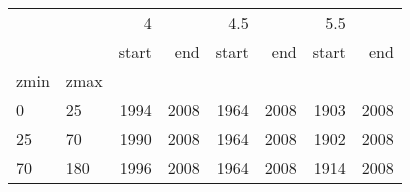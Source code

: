 \begin{tabular}{llrrrrrr}
\toprule
     &      &     4 &       &   4.5 &       &   5.5 &       \\
     &      & start &   end & start &   end & start &   end \\
\midrule
zmin & zmax &       &       &       &       &       &       \\
0   & 25  &  1994 &  2008 &  1964 &  2008 &  1903 &  2008 \\
25  & 70  &  1990 &  2008 &  1964 &  2008 &  1902 &  2008 \\
70  & 180 &  1996 &  2008 &  1964 &  2008 &  1914 &  2008 \\
\bottomrule
\end{tabular}
